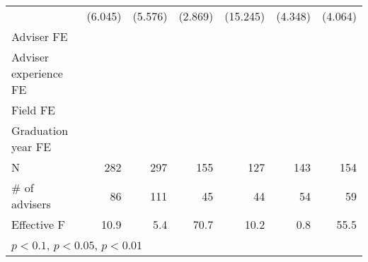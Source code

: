 {\begin{tabular}{l*{6}{D{.}{.}{-1}}}
                              	&        (6.045)         	&        (5.576)         	&        (2.869)         	&       (15.245)         	&        (4.348)         	&        (4.064)         \\
\addlinespace
Adviser FE                    	&     \checkmark         	&     \checkmark         	&     \checkmark         	&     \checkmark         	&     \checkmark         	&     \checkmark         \\
\addlinespace
Adviser experience FE         	&     \checkmark         	&     \checkmark         	&     \checkmark         	&     \checkmark         	&     \checkmark         	&     \checkmark         \\
\addlinespace
Field FE                      	&     \checkmark         	&     \checkmark         	&     \checkmark         	&     \checkmark         	&     \checkmark         	&     \checkmark         \\
\addlinespace
Graduation year FE            	&     \checkmark         	&     \checkmark         	&     \checkmark         	&     \checkmark         	&     \checkmark         	&     \checkmark         \\
\midrule
N                             	&            282         	&            297         	&            155         	&            127         	&            143         	&            154         \\
\# of advisers                	&             86         	&            111         	&             45         	&             44         	&             54         	&             59         \\
Effective F                   	&           10.9         	&            5.4         	&           70.7         	&           10.2         	&            0.8         	&           55.5         \\
\bottomrule
{}\\
\end{tabular}
}
